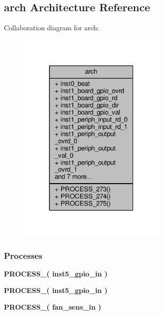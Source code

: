 \subsection{arch Architecture Reference}
\label{classgeneral__periph__top_1_1arch}


Collaboration diagram for arch\+:\nopagebreak
\begin{figure}[H]
\begin{center}
\leavevmode
\includegraphics[width=208pt]{d2/dc8/classgeneral__periph__top_1_1arch__coll__graph}
\end{center}
\end{figure}
\subsubsection*{Processes}
 \begin{DoxyCompactItemize}
\item 
{\bf P\+R\+O\+C\+E\+S\+S\+\_}{\bfseries  ( {\bfseries {\bfseries {\bf inst5\+\_\+gpio\+\_\+in}} \textcolor{vhdlchar}{ }} )}
\item 
{\bf P\+R\+O\+C\+E\+S\+S\+\_}{\bfseries  ( {\bfseries {\bfseries {\bf inst5\+\_\+gpio\+\_\+in}} \textcolor{vhdlchar}{ }} )}
\item 
{\bf P\+R\+O\+C\+E\+S\+S\+\_}{\bfseries  ( {\bfseries {\bfseries {\bf fan\+\_\+sens\+\_\+in}} \textcolor{vhdlchar}{ }} )}
\end{DoxyCompactItemize}
